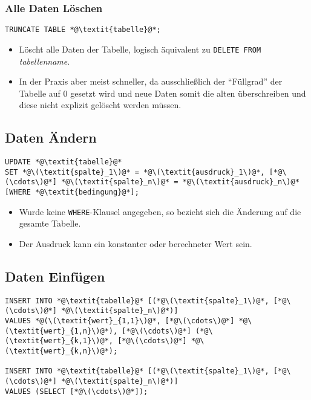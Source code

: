 \documentclass[a4paper, 11pt, accentcolor = tud3b]{tudreport}
\begin{document}
                \subsubsection{Alle Daten Löschen} %
                    \begin{lstlisting}
TRUNCATE TABLE *@\textit{tabelle}@*;
                    \end{lstlisting}
                    
                    \begin{itemize}
                    	\item Löscht alle Daten der Tabelle, logisch äquivalent zu \lstinline|DELETE FROM| \textit{tabellenname}.
                    	\item In der Praxis aber meist schneller, da ausschließlich der \enquote{Füllgrad} der Tabelle auf 0 gesetzt wird und neue Daten somit die alten überschreiben und diese nicht explizit gelöscht werden müssen.
                    \end{itemize}

            \subsection{Daten Ändern} %
                \begin{lstlisting}
UPDATE *@\textit{tabelle}@*
SET *@\(\textit{spalte}_1\)@* = *@\(\textit{ausdruck}_1\)@*, [*@\(\cdots\)@*] *@\(\textit{spalte}_n\)@* = *@\(\textit{ausdruck}_n\)@*
[WHERE *@\textit{bedingung}@*];
                \end{lstlisting}
                
                \begin{itemize}
                	\item Wurde keine \lstinline|WHERE|-Klausel angegeben, so bezieht sich die Änderung auf die gesamte Tabelle.
                	\item Der Ausdruck kann ein konstanter oder berechneter Wert sein.
                \end{itemize}

            \subsection{Daten Einfügen} %
                \begin{lstlisting}
INSERT INTO *@\textit{tabelle}@* [(*@\(\textit{spalte}_1\)@*, [*@\(\cdots\)@*] *@\(\textit{spalte}_n\)@*)]
VALUES *@(\(\textit{wert}_{1,1}\)@*, [*@\(\cdots\)@*] *@\(\textit{wert}_{1,n}\)@*), [*@\(\cdots\)@*] (*@\(\textit{wert}_{k,1}\)@*, [*@\(\cdots\)@*] *@\(\textit{wert}_{k,n}\)@*);

INSERT INTO *@\textit{tabelle}@* [(*@\(\textit{spalte}_1\)@*, [*@\(\cdots\)@*] *@\(\textit{spalte}_n\)@*)]
VALUES (SELECT [*@\(\cdots\)@*]);
                \end{lstlisting}
                
\end{document}
